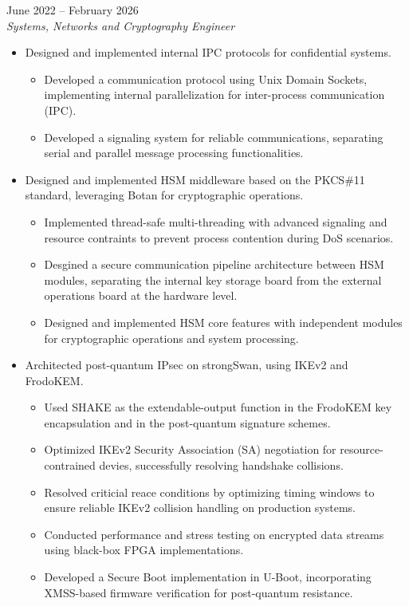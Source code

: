 \documentclass[11pt,a4paper]{article}
\newenvironment{job}[3]{%
  \vspace{0.55em}%
  \noindent{\bfseries #1}\hfill{\color{cvaccent}#2}\\[0.1em]
  \textit{#3}\par
  \begin{itemize}
}{%
  \end{itemize}
}
\begin{document}
\begin{job}{Epicom S.A.}{June 2022 -- February 2026}{Systems, Networks and Cryptography Engineer}
  \item Designed and implemented internal IPC protocols for confidential systems.
  \begin{itemize}
    \item Developed a communication protocol using Unix Domain Sockets, implementing internal parallelization for inter-process communication (IPC).
    \item Developed a signaling system for reliable communications, separating serial and parallel message processing functionalities.
  \end{itemize}
  \item Designed and implemented HSM middleware based on the PKCS\#11 standard, leveraging Botan for cryptographic operations.
  \begin{itemize}
    \item Implemented thread-safe multi-threading with advanced signaling and resource contraints to prevent process contention during DoS scenarios.
    \item Desgined a secure communication pipeline architecture between HSM modules, separating the internal key storage board from the external operations board at the hardware level.
    \item Designed and implemented HSM core features with independent modules for cryptographic operations and system processing.
  \end{itemize}
  \item Architected post-quantum IPsec on strongSwan, using IKEv2 and FrodoKEM.
  \begin{itemize}
    \item Used SHAKE as the extendable-output function in the FrodoKEM key encapsulation and in the post-quantum signature schemes.
    \item Optimized IKEv2 Security Association (SA) negotiation for resource-contrained devies, successfully resolving handshake collisions.
    \item Resolved criticial reace conditions by optimizing timing windows to ensure reliable IKEv2 collision handling on production systems.
    \item Conducted performance and stress testing on encrypted data streams using black-box FPGA implementations.
    \item Developed a Secure Boot implementation in U-Boot, incorporating XMSS-based firmware verification for post-quantum resistance.

\end{itemize}
\end{job}
\end{document}
